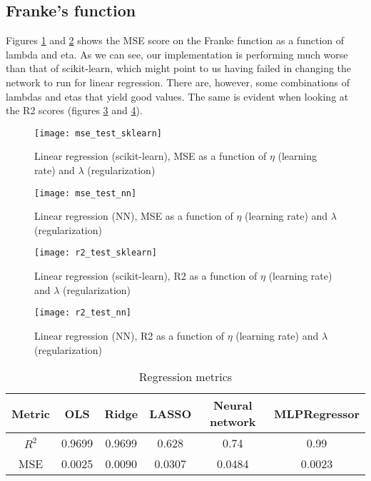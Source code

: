 \documentclass[11pt,english, A4]{article}
\begin{document}
\subsection{Franke's function}

Figures \ref{fig:mse_test_sklearn} and \ref{fig:mse_test_nn} shows the MSE score on the Franke function as a function of lambda and eta. As we can see, our implementation is performing much worse than that of scikit-learn, which might point to us having failed in changing the network to run for linear regression. There are, however, some combinations of lambdas and etas that yield good values. The same is evident when looking at the R2 scores (figures \ref{fig:r2_test_sklearn} and \ref{fig:r2_test_nn}).

\begin{figure}[H]
\begin{center}
  \texttt{[image: mse\_test\_sklearn]}
  \caption{Linear regression (scikit-learn), MSE as a function of $\eta$ (learning rate) and $\lambda$ (regularization)}
  \label{fig:mse_test_sklearn}
  \end{center}
\end{figure}

\begin{figure}[H]
\begin{center}
  \texttt{[image: mse\_test\_nn]}
  \caption{Linear regression (NN), MSE as a function of $\eta$ (learning rate) and $\lambda$ (regularization)}
  \label{fig:mse_test_nn}
  \end{center}
\end{figure}

\begin{figure}[H]
\begin{center}
  \texttt{[image: r2\_test\_sklearn]}
  \caption{Linear regression (scikit-learn), R2 as a function of $\eta$ (learning rate) and $\lambda$ (regularization)}
  \label{fig:r2_test_sklearn}
  \end{center}
\end{figure}

\begin{figure}[H]
\begin{center}
  \texttt{[image: r2\_test\_nn]}
  \caption{Linear regression (NN), R2 as a function of $\eta$ (learning rate) and $\lambda$ (regularization)}
  \label{fig:r2_test_nn}
  \end{center}
\end{figure}

\begin{center}
\begin{table}
 \begin{tabular}{|c | c c c c c|} 
 \hline
 Metric & OLS & Ridge & LASSO & \textbf{Neural network} & \textbf{MLPRegressor} \\ [0.5ex] 
 \hline
$R^{2}$ & 0.9699 & 0.9699 & 0.628 & 0.74 & 0.99 \\ 
 \hline
 MSE & 0.0025 & 0.0090 & 0.0307 & 0.0484 & 0.0023  \\ [1ex] 
 \hline 
 \end{tabular}
 \caption{Regression metrics}
 \label{tab:reg_mets}
 \end{table} 
\end{center}
\end{document}
